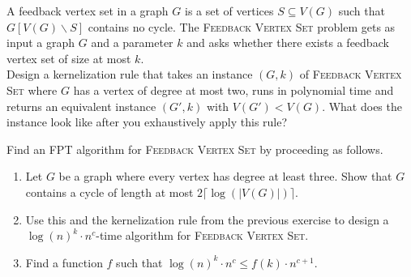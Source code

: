 \documentclass{article}
\begin{document}
\begin{exercise}
    A feedback vertex set in a graph $G$ is a set of vertices $S\subseteq V(G)$ such that $G[V(G)\backslash S]$ contains no cycle. The \textsc{Feedback Vertex Set} problem gets as input a graph $G$ and a parameter $k$ and asks whether there exists a feedback vertex set of size at most $k$. \\
    Design a kernelization rule that takes an instance $(G,k)$ of \textsc{Feedback Vertex Set} where $G$ has a vertex of degree at most two, runs in polynomial time and returns an equivalent instance $(G', k)$ with $V(G') < V(G)$. What does the instance look like after you exhaustively apply this rule?
\end{exercise}

\begin{exercise}
    Find an FPT algorithm for \textsc{Feedback Vertex Set} by proceeding as follows.\begin{enumerate}
        \item Let $G$ be a graph where every vertex has degree at least three. Show that $G$ contains a cycle of length at most $2\lceil\log(|V(G)|)\rceil$.
        \item Use this and the kernelization rule from the previous exercise to design a $\log(n)^k\cdot n^c$-time algorithm for \textsc{Feedback Vertex Set}.
        \item Find a function $f$ such that $\log(n)^k\cdot n^c\leq f(k)\cdot n^{c+1}$.
    \end{enumerate}
\end{exercise}
\end{document}
